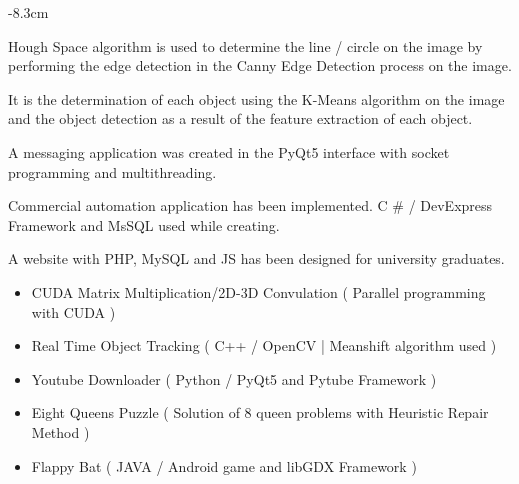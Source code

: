 \documentclass[10pt,a4paper]{altacv}
\begin{document}
\begin{adjustwidth}{}{-8.3cm}
\divider

Hough Space algorithm is used to determine the line / circle on the image by performing the edge detection in the Canny Edge Detection process on the image.


\divider

It is the determination of each object using the K-Means algorithm on the image and the object detection as a result of the feature extraction of each object.


\divider

A messaging application was created in the PyQt5 interface with socket programming and multithreading.

\divider

Commercial automation application has been implemented.
C \# / DevExpress Framework and MsSQL used while creating.

\divider

A website with PHP, MySQL and JS has been designed for university graduates.
\divider

\begin{itemize}
    \item CUDA Matrix Multiplication/2D-3D Convulation ( Parallel programming with CUDA )
    \item Real Time Object Tracking ( C++ / OpenCV | Meanshift algorithm used )
    \item Youtube Downloader ( Python / PyQt5 and Pytube Framework )
    \item Eight Queens Puzzle ( Solution of 8 queen problems with Heuristic Repair Method )
    \item Flappy Bat ( JAVA / Android game and libGDX Framework )
    
\end{itemize}


\smallskip



\end{adjustwidth}
\end{document}
